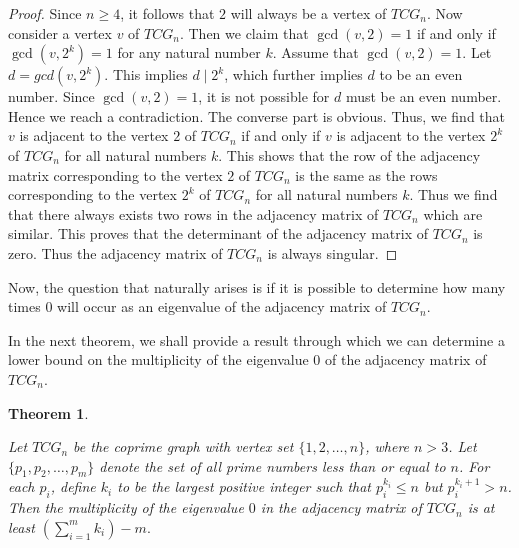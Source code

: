 \documentclass[12pt]{article}
\newtheorem{theorem}{Theorem}[section]
\begin{document}
	\begin{proof}
		Since $n\ge 4$, it follows that $2$ will always be a vertex of $TCG_n$.
		Now consider a vertex $v$ of $TCG_n$. Then we claim that $\gcd(v,2)=1$ if and only if $\gcd(v,2^k)=1$ for any natural number $k$. Assume that $\gcd(v,2)=1$. Let $d=gcd(v,2^k)$. This implies $d\mid 2^k$, which further implies $d$ to be an even number. Since $\gcd(v,2)=1$, it is not possible for $d$ must be an even number. Hence we reach a contradiction. The converse part is obvious.
		Thus, we find that $v$ is adjacent to the vertex $2$ of $TCG_n$ if and only if $v$ is adjacent to the vertex $2^k$ of $TCG_n$ for all natural numbers $k$.
		This shows that the row of the adjacency matrix corresponding to the vertex $2$ of $TCG_n$ is the same as the rows corresponding to the vertex $2^k$ of $TCG_n$ for all natural numbers $k$. Thus we find that there always exists two rows in the adjacency matrix of $TCG_n$ which are similar.
		This proves that the determinant of the adjacency matrix of $TCG_n$ is zero. Thus the adjacency matrix of $TCG_n$ is always singular.
	\end{proof}
	
	Now, the question that naturally arises is if it is possible to determine how many times $0$ will occur as an eigenvalue of the adjacency matrix of $TCG_n$.
	
	In the next theorem, we shall provide a result through which we can determine a lower bound on the multiplicity of the eigenvalue $0$ of the adjacency matrix of $TCG_n$.
	
	\begin{theorem}
		\label{number4}
		
		Let \( TCG_n \) be the coprime graph with vertex set \( \{1, 2, \ldots, n\} \), where \( n > 3 \). Let \( \{p_1, p_2, \ldots, p_m\} \) denote the set of all prime numbers less than or equal to \( n \). For each \( p_i \), define \( k_i \) to be the largest positive integer such that \( p_i^{k_i} \leq n \) but \( p_i^{k_i+1} > n \). Then the multiplicity of the eigenvalue \( 0 \) in the adjacency matrix of \( TCG_n \) is at least $
		\left( \sum_{i=1}^{m} k_i \right) - m.$
	\end{theorem}
	
\end{document}
